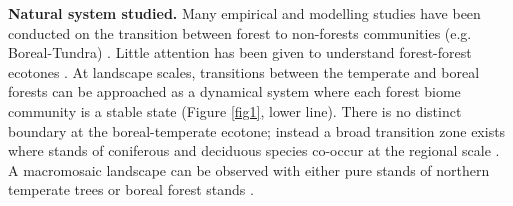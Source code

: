 \textbf{Natural system studied.} Many empirical and modelling studies have been
conducted on the transition between forest to non-forests communities (e.g. Boreal-Tundra) 
\cite{Scheffer2012,Scheffer2001,Hirota2011,Messaoud2007}. Little
attention has been given to understand forest-forest ecotones
\cite{Goldblum2010,Graignic2013,Messaoud2007}. 
At landscape scales, transitions
between  the temperate and boreal forests can be approached as a dynamical
system where each forest biome community is a stable state (Figure \ref{fig1},
lower line). There is no distinct boundary at the boreal-temperate ecotone;
instead a broad transition zone exists where stands of coniferous and
deciduous species co-occur at the regional scale
\cite{Goldblum2010,Fisichelli2013}. 
A macromosaic landscape can be observed
with either pure stands of northern temperate trees or boreal forest stands
\cite{Goldblum2010,Fisichelli2013}. 

